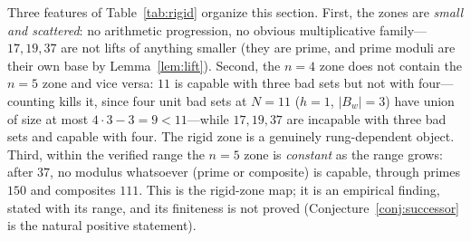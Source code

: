 \documentclass[11pt,a4paper]{article}
\numberwithin{equation}{section}
\theoremstyle{plain}
\theoremstyle{plain}
\theoremstyle{definition}
\theoremstyle{remark}
\begin{document}
\begin{center}
\end{center}

Three features of Table~\ref{tab:rigid} organize this section. First, the
zones are \emph{small and scattered}: no arithmetic progression, no
obvious multiplicative family---$17,19,37$ are not lifts of anything
smaller (they are prime, and prime moduli are their own base by
Lemma~\ref{lem:lift}). Second, the $n=4$ zone does not contain the $n=5$
zone and vice versa: $11$ is capable with three bad sets but not with
four---counting kills it, since four unit bad sets at $N=11$ ($h=1$,
$|B_w|=3$) have union of size at most $4\cdot 3-3=9<11$---while
$17,19,37$ are incapable with three bad sets and capable with four. The
rigid zone is a genuinely rung-dependent object. Third, within the
verified range the $n=5$ zone is \emph{constant} as the range grows:
after $37$, no modulus whatsoever (prime or composite) is capable, through
primes $150$ and composites $111$. This is the rigid-zone map; it is
an empirical finding, stated with its range, and its
finiteness is not proved (Conjecture~\ref{conj:successor} is the natural
positive statement).
\end{document}
